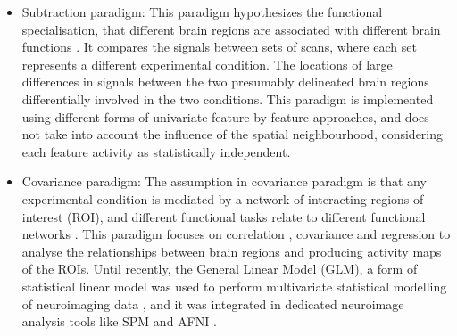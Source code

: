 \begin{itemize}
	\item Subtraction paradigm: This paradigm hypothesizes the functional specialisation, that different brain regions are associated with different brain functions \citep{fristen1997imaging, posner1988localization}. It compares the signals between sets of scans, where each set represents a different experimental condition. The locations of large differences in signals between the two presumably delineated brain regions differentially involved in the two conditions. This paradigm is implemented using different forms of univariate \citep{woolrich2001temporal} feature by feature approaches, and does not take into account the influence of the spatial neighbourhood, considering each feature activity as statistically independent.
	\item Covariance paradigm: The assumption in covariance paradigm is that any experimental condition is mediated by a network of interacting regions of interest (ROI), and different functional tasks relate to different functional networks \citep{horwitz1992covariance, mesulam1990large}. This paradigm focuses on correlation \citep{horwitz1992functional}, covariance and regression \citep{friston1997psychophysiological} to analyse the relationships between brain regions and producing activity maps of the ROIs. Until recently, the General Linear Model (GLM), a form of statistical linear model was used to perform multivariate statistical modelling of neuroimaging data \citep{beckmann2003general, calhoun2004fmri}, and it was integrated in dedicated neuroimage analysis tools like SPM \citep{friston1994statistical} and AFNI \citep{cox1996afni}.
\end{itemize}

